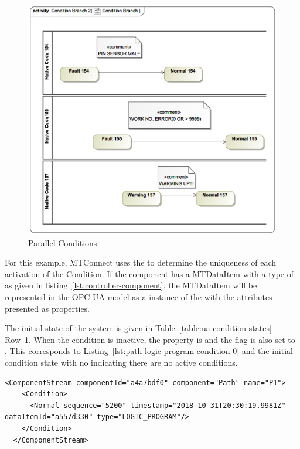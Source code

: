 \begin{figure}[ht]
  \centering
  \includegraphics[width=1.0\textwidth]{diagrams/mtconnect-mapping/condition-branching.png}
  \caption{Parallel Conditions}
  \label{fig:condition-branching}
\end{figure}

\FloatBarrier

For this example, MTConnect uses the  to determine the uniqueness of each activation of the Condition. If the  component has a \gls{MTDataItem} with a \gls{type} of  as given in listing~\ref{lst:controller-component}, the \gls{MTDataItem} will be represented in the OPC UA model as a instance of the  with the attributes presented as properties.

The initial state of the system is given in Table~\ref{table:ua-condition-states} Row~1. When the condition is inactive, the  property is  and the  flag is also set to . This corresponds to Listing~\ref{lst:path-logic-program-condition-0} and the  initial condition state with no  indicating there are no active conditions.

\begin{lstlisting}[firstnumber=1,escapechar=|,%
    caption={Path Logic Program Initial Normal State},label={lst:path-logic-program-condition-0}]
  <ComponentStream componentId="a4a7bdf0" component="Path" name="P1">
    <Condition>
      <Normal sequence="5200" timestamp="2018-10-31T20:30:19.9981Z" dataItemId="a557d330" type="LOGIC_PROGRAM"/>
    </Condition>
  </ComponentStream>
\end{lstlisting}

